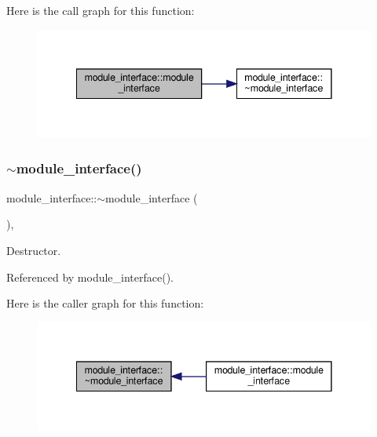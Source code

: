 Here is the call graph for this function\+:
\nopagebreak
\begin{figure}[H]
\begin{center}
\leavevmode
\includegraphics[width=341pt]{d9/d0e/classmodule__interface_a431ffd0a2b0d67a4d545a98cf75d6758_cgraph}
\end{center}
\end{figure}
\mbox{\label{classmodule__interface_affdb64d9e2c9f16e5b07504cd5b650c7}} 
\subsubsection{\texorpdfstring{$\sim$module\+\_\+interface()}{~module\_interface()}}
{\footnotesize\ttfamily module\+\_\+interface\+::$\sim$module\+\_\+interface (\begin{DoxyParamCaption}{ }\end{DoxyParamCaption})\hspace{0.3cm}{\ttfamily [override]}, {\ttfamily [default]}}



Destructor. 



Referenced by module\+\_\+interface().

Here is the caller graph for this function\+:
\nopagebreak
\begin{figure}[H]
\begin{center}
\leavevmode
\includegraphics[width=341pt]{d9/d0e/classmodule__interface_affdb64d9e2c9f16e5b07504cd5b650c7_icgraph}
\end{center}
\end{figure}


